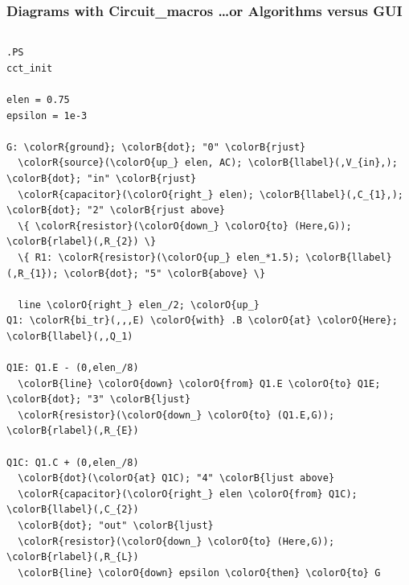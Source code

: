\begin{frame}[fragile]
  \frametitle{Diagrams with Circuit\_macros \ldots or Algorithms versus GUI}
  \begin{columns}
    \begin{column}{.5\textwidth}
      \fontsize{6pt}{6pt}\selectfont
\begin{Verbatim}[commandchars=\\\{\}]
.PS
cct_init

elen = 0.75
epsilon = 1e-3

G: \colorR{ground}; \colorB{dot}; "0" \colorB{rjust}
  \colorR{source}(\colorO{up_} elen, AC); \colorB{llabel}(,V_{in},); \colorB{dot}; "in" \colorB{rjust}
  \colorR{capacitor}(\colorO{right_} elen); \colorB{llabel}(,C_{1},); \colorB{dot}; "2" \colorB{rjust above}
  \{ \colorR{resistor}(\colorO{down_} \colorO{to} (Here,G)); \colorB{rlabel}(,R_{2}) \}
  \{ R1: \colorR{resistor}(\colorO{up_} elen_*1.5); \colorB{llabel}(,R_{1}); \colorB{dot}; "5" \colorB{above} \}

  line \colorO{right_} elen_/2; \colorO{up_}
Q1: \colorR{bi_tr}(,,,E) \colorO{with} .B \colorO{at} \colorO{Here}; \colorB{llabel}(,,Q_1)

Q1E: Q1.E - (0,elen_/8)
  \colorB{line} \colorO{down} \colorO{from} Q1.E \colorO{to} Q1E; \colorB{dot}; "3" \colorB{ljust}
  \colorR{resistor}(\colorO{down_} \colorO{to} (Q1.E,G)); \colorB{rlabel}(,R_{E})

Q1C: Q1.C + (0,elen_/8)
  \colorB{dot}(\colorO{at} Q1C); "4" \colorB{ljust above}
  \colorR{capacitor}(\colorO{right_} elen \colorO{from} Q1C); \colorB{llabel}(,C_{2})
  \colorB{dot}; "out" \colorB{ljust}
  \colorR{resistor}(\colorO{down_} \colorO{to} (Here,G)); \colorB{rlabel}(,R_{L})
  \colorB{line} \colorO{down} epsilon \colorO{then} \colorO{to} G


\end{Verbatim}
\end{column}
\end{columns}
\end{frame}
